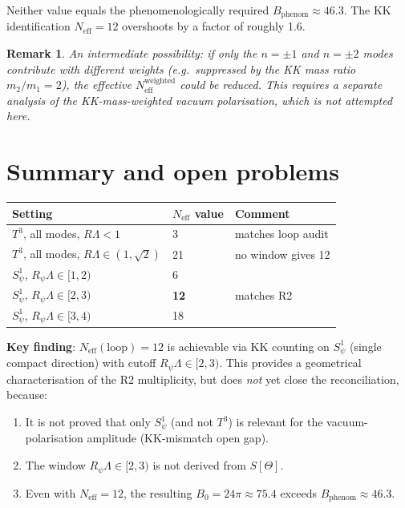 \documentclass[12pt,a4paper]{article}
\newtheorem{remark}{Remark}[section]
\newcommand{\Neff}{N_{\mathrm{eff}}}
\begin{document}
Neither value equals the phenomenologically required $B_{\mathrm{phenom}} \approx 46.3$.
The KK identification $\Neff = 12$ overshoots by a factor of roughly 1.6.

\begin{remark}
An intermediate possibility: if only the $n = \pm 1$ \emph{and} $n = \pm 2$
modes contribute with \emph{different weights} (e.g.\ suppressed by the KK
mass ratio $m_2/m_1 = 2$), the effective $\Neff^{\mathrm{weighted}}$ could
be reduced.  This requires a separate analysis of the KK-mass-weighted vacuum
polarisation, which is not attempted here.
\end{remark}

\section{Summary and open problems}

\begin{center}
\begin{tabular}{lll}
\toprule
Setting & $\Neff$ value & Comment \\
\midrule
$T^3$, all modes, $R\Lambda < 1$ & 3 & matches loop audit \\
$T^3$, all modes, $R\Lambda \in (1,\sqrt{2})$ & 21 & no window gives 12 \\
$S^1_\psi$, $R_\psi\Lambda \in [1,2)$ & 6 & \\
$S^1_\psi$, $R_\psi\Lambda \in [2,3)$ & \textbf{12} & matches R2 \\
$S^1_\psi$, $R_\psi\Lambda \in [3,4)$ & 18 & \\
\bottomrule
\end{tabular}
\end{center}

\textbf{Key finding}: $\Neff(\mathrm{loop}) = 12$ is achievable via KK counting
on $S^1_\psi$ (single compact direction) with cutoff $R_\psi\Lambda \in [2,3)$.
This provides a geometrical characterisation of the R2 multiplicity, but does
\emph{not} yet close the reconciliation, because:
\begin{enumerate}
  \item It is not proved that only $S^1_\psi$ (and not $T^3$) is relevant for
        the vacuum-polarisation amplitude (KK-mismatch open gap).
  \item The window $R_\psi\Lambda \in [2,3)$ is not derived from $S[\Theta]$.
  \item Even with $\Neff = 12$, the resulting $B_0 = 24\pi \approx 75.4$
        exceeds $B_{\mathrm{phenom}} \approx 46.3$.
\end{enumerate}
\end{document}
